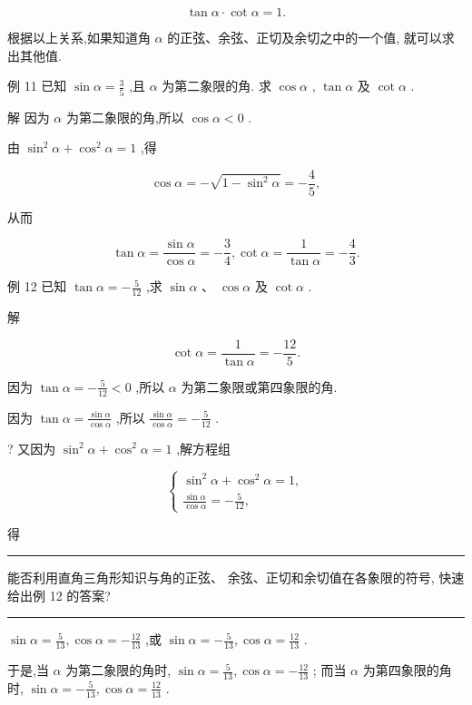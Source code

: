\documentclass[10pt]{article}
\newcommand{\HRule}{\begin{center}\rule{0.9\linewidth}{0.2mm}\end{center}}
\begin{document}
\[
\tan \alpha  \cdot  \cot \alpha  = 1.
\]

根据以上关系,如果知道角 \(\alpha\) 的正弦、余弦、正切及余切之中的一个值, 就可以求出其他值.

例 11 已知 \(\sin \alpha  = \frac{3}{5}\) ,且 \(\alpha\) 为第二象限的角. 求 \(\cos \alpha\) , \(\tan \alpha\) 及 \(\cot \alpha\) .

解 因为 \(\alpha\) 为第二象限的角,所以 \(\cos \alpha  < 0\) .

由 \({\sin }^{2}\alpha  + {\cos }^{2}\alpha  = 1\) ,得

\[
\cos \alpha  =  - \sqrt{1 - {\sin }^{2}\alpha } =  - \frac{4}{5},
\]

从而

\[
\tan \alpha  = \frac{\sin \alpha }{\cos \alpha } =  - \frac{3}{4},\cot \alpha  = \frac{1}{\tan \alpha } =  - \frac{4}{3}.
\]

例 12 已知 \(\tan \alpha  =  - \frac{5}{12}\) ,求 \(\sin \alpha \text{ 、 }\cos \alpha\) 及 \(\cot \alpha\) .

解

\[
\cot \alpha  = \frac{1}{\tan \alpha } =  - \frac{12}{5}.
\]

因为 \(\tan \alpha  =  - \frac{5}{12} < 0\) ,所以 \(\alpha\) 为第二象限或第四象限的角.

因为 \(\tan \alpha  = \frac{\sin \alpha }{\cos \alpha }\) ,所以 \(\frac{\sin \alpha }{\cos \alpha } =  - \frac{5}{12}\) .

? 又因为 \({\sin }^{2}\alpha  + {\cos }^{2}\alpha  = 1\) ,解方程组

\[
\left\{  \begin{array}{l} {\sin }^{2}\alpha  + {\cos }^{2}\alpha  = 1, \\  \frac{\sin \alpha }{\cos \alpha } =  - \frac{5}{12}, \end{array}\right.
\]

得

\HRule

能否利用直角三角形知识与角的正弦、 余弦、正切和余切值在各象限的符号, 快速给出例 12 的答案?

\HRule

\(\sin \alpha  = \frac{5}{13},\cos \alpha  =  - \frac{12}{13}\) ,或 \(\sin \alpha  =  - \frac{5}{13},\cos \alpha  = \frac{12}{13}\) .

于是,当 \(\alpha\) 为第二象限的角时, \(\sin \alpha  = \frac{5}{13},\cos \alpha  =  - \frac{12}{13}\) ; 而当 \(\alpha\) 为第四象限的角时, \(\sin \alpha  =  - \frac{5}{13},\cos \alpha  = \frac{12}{13}\) .
\end{document}
